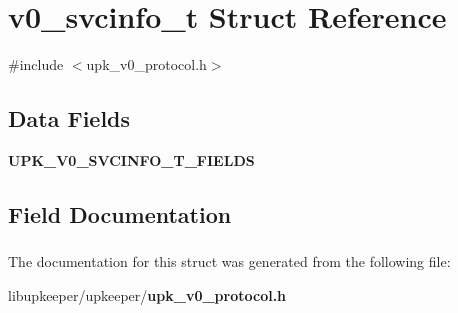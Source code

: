 \section{v0\_\-svcinfo\_\-t Struct Reference}
\label{structv0__svcinfo__t}


{\ttfamily \#include $<$upk\_\-v0\_\-protocol.h$>$}

\subsection*{Data Fields}
\begin{DoxyCompactItemize}
\item 
{\bf UPK\_\-V0\_\-SVCINFO\_\-T\_\-FIELDS}
\end{DoxyCompactItemize}


\subsection{Field Documentation}
\subsubsection[{UPK\_\-V0\_\-SVCINFO\_\-T\_\-FIELDS}]{}\label{structv0__svcinfo__t_a9dcbd16f49c76e2ec3bb8a89784060d1}


The documentation for this struct was generated from the following file:\begin{DoxyCompactItemize}
\item 
libupkeeper/upkeeper/{\bf upk\_\-v0\_\-protocol.h}\end{DoxyCompactItemize}
